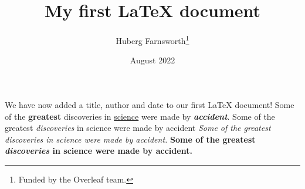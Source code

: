 \documentclass[12pt, letterpaper]{article}
\title{My first LaTeX document}
\author{Huberg Farnsworth\thanks{Funded by the Overleaf team.}}
\date{August 2022}
\begin{document}
\maketitle
We have now added a title, author and date to our first \LaTeX{} document!
Some of the \textbf{greatest} discoveries in \underline{science} were made by \textbf{\textit{accident}}.
Some of the greatest \emph{discoveries} in science were made by accident
\textit{Some of the greatest \emph{discoveries} in science were made by accident.}
\textbf{Some of the greatest \emph{discoveries} in science were made by accident.}
\end{document}
